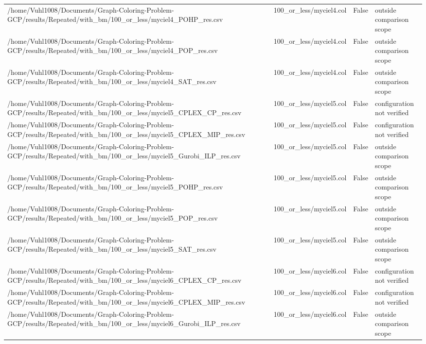 \begin{table}[htbp]
\begin{tabular}{llll}
/home/Vuhl1008/Documents/Graph-Coloring-Problem-GCP/results/Repeated/with\_bm/100\_or\_less/myciel4\_POHP\_res.csv & 100\_or\_less/myciel4.col & False & outside comparison scope \\
/home/Vuhl1008/Documents/Graph-Coloring-Problem-GCP/results/Repeated/with\_bm/100\_or\_less/myciel4\_POP\_res.csv & 100\_or\_less/myciel4.col & False & outside comparison scope \\
/home/Vuhl1008/Documents/Graph-Coloring-Problem-GCP/results/Repeated/with\_bm/100\_or\_less/myciel4\_SAT\_res.csv & 100\_or\_less/myciel4.col & False & outside comparison scope \\
/home/Vuhl1008/Documents/Graph-Coloring-Problem-GCP/results/Repeated/with\_bm/100\_or\_less/myciel5\_CPLEX\_CP\_res.csv & 100\_or\_less/myciel5.col & False & configuration not verified \\
/home/Vuhl1008/Documents/Graph-Coloring-Problem-GCP/results/Repeated/with\_bm/100\_or\_less/myciel5\_CPLEX\_MIP\_res.csv & 100\_or\_less/myciel5.col & False & configuration not verified \\
/home/Vuhl1008/Documents/Graph-Coloring-Problem-GCP/results/Repeated/with\_bm/100\_or\_less/myciel5\_Gurobi\_ILP\_res.csv & 100\_or\_less/myciel5.col & False & outside comparison scope \\
/home/Vuhl1008/Documents/Graph-Coloring-Problem-GCP/results/Repeated/with\_bm/100\_or\_less/myciel5\_POHP\_res.csv & 100\_or\_less/myciel5.col & False & outside comparison scope \\
/home/Vuhl1008/Documents/Graph-Coloring-Problem-GCP/results/Repeated/with\_bm/100\_or\_less/myciel5\_POP\_res.csv & 100\_or\_less/myciel5.col & False & outside comparison scope \\
/home/Vuhl1008/Documents/Graph-Coloring-Problem-GCP/results/Repeated/with\_bm/100\_or\_less/myciel5\_SAT\_res.csv & 100\_or\_less/myciel5.col & False & outside comparison scope \\
/home/Vuhl1008/Documents/Graph-Coloring-Problem-GCP/results/Repeated/with\_bm/100\_or\_less/myciel6\_CPLEX\_CP\_res.csv & 100\_or\_less/myciel6.col & False & configuration not verified \\
/home/Vuhl1008/Documents/Graph-Coloring-Problem-GCP/results/Repeated/with\_bm/100\_or\_less/myciel6\_CPLEX\_MIP\_res.csv & 100\_or\_less/myciel6.col & False & configuration not verified \\
/home/Vuhl1008/Documents/Graph-Coloring-Problem-GCP/results/Repeated/with\_bm/100\_or\_less/myciel6\_Gurobi\_ILP\_res.csv & 100\_or\_less/myciel6.col & False & outside comparison scope \\

\end{tabular}
\end{table}
